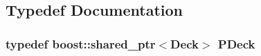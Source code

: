 \subsection{Typedef Documentation}
\subsubsection[{P\-Deck}]{\setlength{\rightskip}{0pt plus 5cm}typedef boost\-::shared\-\_\-ptr$<${\bf Deck}$>$ {\bf P\-Deck}}\label{start_8h_a2b67b51e6d5f36a9b82808f41a375a35}
